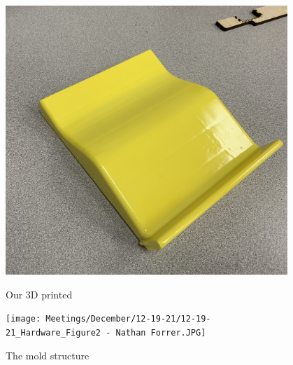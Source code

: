 \begin{figure}[ht]
\centering
\begin{minipage}[b]{.48\textwidth}
  \centering
  \includegraphics[width=0.95\textwidth]{Meetings/December/12-19-21/12-19-21_Hardware_Figure1 - Nathan Forrer.jpg}
  \caption{Our 3D printed}
  \label{fig:121921_1}
\end{minipage}%
\hfill%
\begin{minipage}[b]{.48\textwidth}
  \centering
  \texttt{[image: Meetings/December/12-19-21/12-19-21\_Hardware\_Figure2 - Nathan Forrer.JPG]}
  \caption{The mold structure}
  \label{fig:121921_2}
\end{minipage}
\end{figure}

